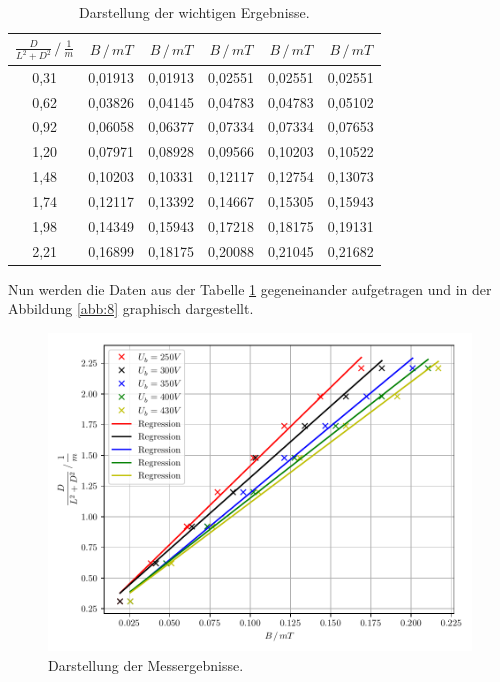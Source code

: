 \begin{table}[H]
  \centering
  \caption{Darstellung der wichtigen Ergebnisse.}
  \label{tab:5}
  \begin{tabular}{c c c c c c}
\toprule
$\frac{D}{L^2+D^2} \, /\, \frac{1}{m}$ & $B \,/\, mT$ & $B \,/\, mT$ &$B \,/\, mT$ &$B \,/\, mT$ &$B \,/\, mT$\\
\midrule
0,31 & 0,01913 & 0,01913 & 0,02551 & 0,02551 & 0,02551\\
0,62 & 0,03826 & 0,04145 & 0,04783 & 0,04783 & 0,05102\\
0,92 & 0,06058 & 0,06377 & 0,07334 & 0,07334 & 0,07653\\
1,20 & 0,07971 & 0,08928 & 0,09566 & 0,10203 & 0,10522\\
1,48 & 0,10203 & 0,10331 & 0,12117 & 0,12754 & 0,13073\\
1,74 & 0,12117 & 0,13392 & 0,14667 & 0,15305 & 0,15943\\
1,98 & 0,14349 & 0,15943 & 0,17218 & 0,18175 & 0,19131\\
2,21 & 0,16899 & 0,18175 & 0,20088 & 0,21045 & 0,21682\\
\bottomrule
  \end{tabular}
\end{table}
Nun werden die Daten aus der Tabelle \ref{tab:5} gegeneinander aufgetragen und
in der Abbildung \ref{abb:8} graphisch dargestellt.
\begin{figure}[H]
  \centering
  \includegraphics[width=\textwidth]{plot3.pdf}
  \caption{Darstellung der Messergebnisse.}
  \label{abb:7}
\end{figure}
